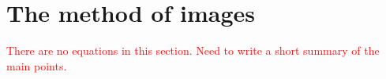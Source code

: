 \section{The method of images}

\textcolor{red}{There are no equations in this section.
Need to write a short summary of the main points.}

